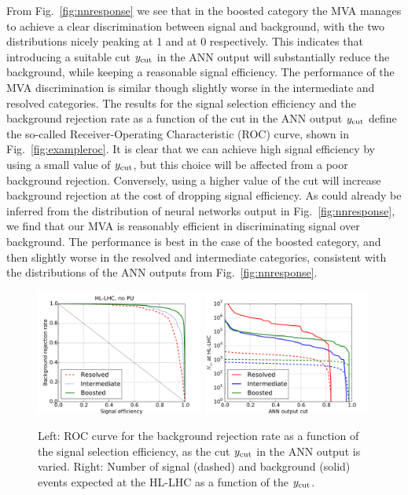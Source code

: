 From Fig.~\ref{fig:nnresponse} we see that in the boosted category the MVA manages
to achieve a clear discrimination between signal and background, with the two distributions
nicely peaking at 1 and at 0 respectively.
%
This indicates that introducing a suitable cut
$y_{\rm cut}$
in the ANN output will substantially reduce the background,
while keeping a reasonable signal efficiency.
%
The performance of the MVA discrimination is similar though slightly worse in the intermediate
and resolved categories.
%
The results for the signal selection efficiency and the 
background rejection rate as a function of the cut in the ANN output
$y_{\rm cut}$
define the so-called  Receiver-Operating Characteristic (ROC)
curve, shown in Fig.~\ref{fig:exampleroc}.
%
It is clear that we can achieve  high signal efficiency by using
a small value of $y_{\rm cut}$, but this choice will be
affected from a poor background
rejection.
%
Conversely, using a higher value of the cut will increase background rejection at the
cost of dropping signal efficiency.
%
As could already be inferred from the distribution of neural
networks output in Fig.~\ref{fig:nnresponse}, we find
that our MVA is reasonably efficient
in discriminating signal over background.
%
The performance is best in the case of the boosted category,
and then slightly worse in the resolved
and intermediate categories, consistent with the distributions of
the ANN outputs from
Fig.~\ref{fig:nnresponse}.
%

\begin{figure}[t]
\begin{center}
  \includegraphics[width=0.49\textwidth]{plots/roc_noPU.pdf}
  \includegraphics[width=0.49\textwidth]{plots/nev2_noPU.pdf}
\caption{\small Left: ROC curve for the background rejection rate as a function of the signal
  selection efficiency, as the cut $y_{\rm cut}$
  in the ANN output is varied.
  Right: Number of signal (dashed) and background (solid)
  events expected at the HL-LHC as a function of the $y_{\rm cut}$.
}
\label{fig:exampleroc}
\label{fig:nev2}
\end{center}
\end{figure}


